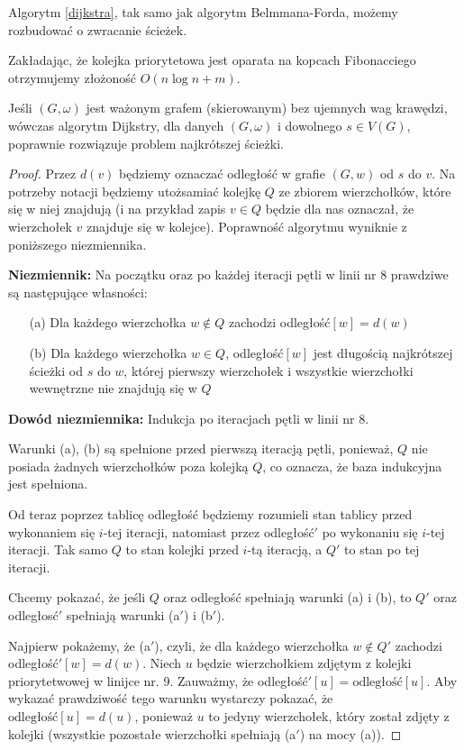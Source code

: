 Algorytm \ref{dijkstra}, tak samo jak algorytm Belmmana-Forda,
możemy rozbudować o zwracanie ścieżek.

Zakładając, że kolejka priorytetowa jest oparata na kopcach 
Fibonacciego otrzymujemy złożoność $O(n\log n + m)$. 

\begin{theorem}
	Jeśli $(G, \omega)$ jest ważonym grafem (skierowanym)
	bez ujemnych wag krawędzi, wówczas algorytm Dijkstry,
	dla danych $(G, \omega)$ i dowolnego $s \in V(G)$, 
	poprawnie rozwiązuje problem najkrótszej ścieżki.
	
	\begin{proof}
		Przez $d(v)$ będziemy oznaczać odległość w 
		grafie $(G, w)$
		od $s$ do $v$. Na potrzeby notacji 
		będziemy utożsamiać
		kolejkę $Q$ ze zbiorem wierzchołków, które
		się w niej znajdują (i na przykład zapis $v \in Q$ 
		będzie dla nas oznaczał, że
		wierzchołek $v$ znajduje się w kolejce).
		Poprawność algorytmu wyniknie z poniższego niezmiennika.
		
		\textbf{Niezmiennik: } Na początku oraz po 
		każdej iteracji pętli w linii nr 8 prawdziwe są 
		następujące własności:
		\begin{itemize}
			\item[(a)] Dla każdego wierzchołka $w \not \in Q$
			zachodzi odległość$[w] = d(w)$ 
			\item[(b)] Dla każdego wierzchołka $w \in Q$,
			odległość$[w]$ jest długością najkrótszej
			ścieżki od $s$ do $w$, której pierwszy wierzchołek 
			i wszystkie wierzchołki wewnętrzne nie znajdują się 
			w $Q$ 
		\end{itemize}
		\textbf{Dowód niezmiennika: } Indukcja po iteracjach
		pętli w linii nr 8.
		
		Warunki (a), (b) są spełnione przed pierwszą iteracją
		pętli, ponieważ, $Q$
		nie posiada żadnych wierzchołków poza 
		kolejką $Q$, co oznacza, że baza indukcyjna jest spełniona.
		
		Od teraz poprzez tablicę odległość będziemy rozumieli 
		stan tablicy przed wykonaniem się $i$-tej iteracji, 
		natomiast przez odległość$'$ po wykonaniu się $i$-tej iteracji.
		Tak samo $Q$ to stan kolejki przed $i$-tą iteracją,
		a $Q'$ to stan po tej iteracji. 
		
		Chcemy pokazać, że jeśli $Q$ oraz odległość spełniają
		warunki (a) i (b), to $Q'$ oraz odległosć$'$ 
		spełniają warunki (a$'$) i (b$'$).
		
		Najpierw pokażemy, że (a$'$), czyli, że
		dla każdego wierzchołka $w \not \in Q'$ zachodzi
		odległość$'[w] = d(w)$. Niech $u$ będzie wierzchołkiem
		zdjętym z kolejki priorytetwowej w linijce nr. 9.
		Zauważmy, że odległość$'[u] = \text{odległość}[u]$. 
		Aby wykazać prawdziwość tego warunku wystarczy
		pokazać, że $\text{odległość}[u] = d(u)$, ponieważ
		$u$ to jedyny wierzchołek, który został zdjęty z kolejki
		(wszystkie pozostałe wierzchołki spełniają 
		(a$'$) na mocy (a)).
		

\end{proof}
\end{theorem}

